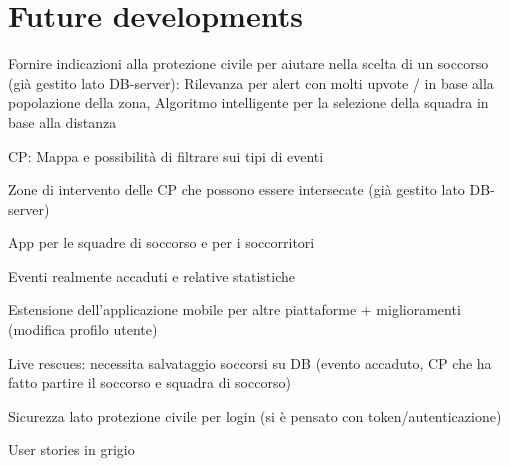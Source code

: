 \documentclass[a4paper,12pt]{report}
\begin{document}
\section{Future developments}
Fornire indicazioni alla protezione civile per aiutare nella scelta di un soccorso (già gestito lato DB-server): Rilevanza per alert con molti upvote / in base alla popolazione della zona, Algoritmo intelligente per la selezione della squadra in base alla distanza

CP: Mappa e possibilità di filtrare sui tipi di eventi

Zone di intervento delle CP che possono essere intersecate (già gestito lato DB-server)

App per le squadre di soccorso e per i soccorritori

Eventi realmente accaduti e relative statistiche

Estensione dell'applicazione mobile per altre piattaforme + miglioramenti (modifica profilo utente)

Live rescues: necessita salvataggio soccorsi su DB (evento accaduto, CP che ha fatto partire il soccorso e squadra di soccorso)

Sicurezza lato protezione civile per login (si è pensato con token/autenticazione)

User stories in grigio
\end{document}
